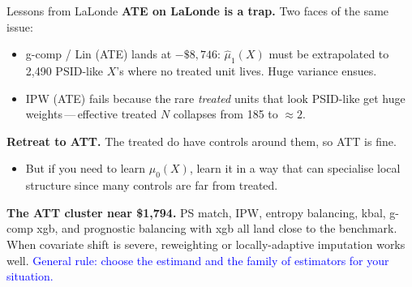 \documentclass[xcolor=dvipsnames]{beamer}
\begin{document}
\begin{frame}{Lessons from LaLonde}
\small
{} \textbf{ATE on LaLonde is a trap.} Two faces of the same issue:\\
\begin{itemize}
\item<2-> g-comp / Lin (ATE) lands at $-\$8{,}746$: $\widehat\mu_1(X)$ must be extrapolated to 2,490 PSID-like $X$'s where no treated unit lives. Huge variance ensues.
\item<3-> IPW (ATE) fails because the rare \textit{treated} units that look PSID-like get huge weights\,---\,effective treated $N$ collapses from 185 to $\approx 2$.
\end{itemize}

\medskip
{} \textbf{Retreat to ATT.} The treated do have controls around them, so ATT is fine. 
\begin{itemize}
\item<5-> But if you need to learn $\mu_0(X)$, learn it in a way that can specialise local structure since many controls are far from treated.
\end{itemize}

\medskip
{} \textbf{The ATT cluster near \$1{,}794.} PS match, IPW, entropy balancing, kbal, g-comp xgb, and prognostic balancing with xgb all land close to the benchmark. When covariate shift is severe, reweighting or locally-adaptive imputation works well.
\medskip
{} \textcolor{Blue}{General rule: choose the estimand and the family of estimators for your situation.}
\end{frame}
\end{document}
